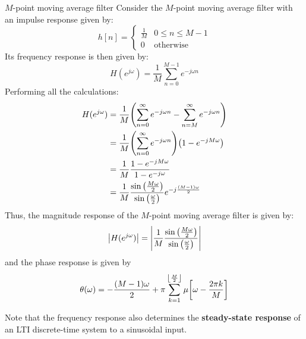 \documentclass[../../main/main.tex]{subfiles}
\begin{document}
\begin{example}{\( M \)-point moving average filter}{}
    Consider the \( M \)-point moving average filter with an impulse response given by:
    \begin{equation}
        h[n]
        =
        \begin{cases}
            \frac{1}{M} &   0 \le n \le M-1 \\
            0   &   \text{otherwise}
        \end{cases}
        \label{eq:L09_S40_1}
    \end{equation}
    Its frequency response is then given by:
    \begin{equation}
        H(e^{j\omega})
        =
        \frac{1}{M} \sum_{n=0}^{M-1} e^{-j\omega n}
        \label{eq:L09_S40_2}
    \end{equation}
    Performing all the calculations:
    \begin{align}
        H(e^{j\omega})
        &=
            \frac{1}{M} \qty(\sum_{n=0}^{\infty} e^{-j\omega n}  -  \sum_{n=M}^{\infty} e^{-j\omega n})    \nonumber   \\
        &=
            \frac{1}{M} \qty(\sum_{n=0}^{\infty} e^{-j\omega n}) \qty(1 - e^{-jM\omega}) \nonumber   \\
        &=
            \frac{1}{M} \frac{1 - e^{-jM\omega}}{1 - e^{-j\omega}}  \nonumber   \\
        &=
            \frac{1}{M} \frac{\sin\qty(\frac{M\omega}{2})}{\sin\qty(\frac{\omega}{2})} e^{-j \frac{(M-1)\omega}{2}}
    \end{align}
    Thus, the magnitude response of the \( M \)-point moving average filter is given by:
    \begin{equation}
        \abs{H(e^{j\omega})}
        =
        \abs{\frac{1}{M} \frac{\sin\qty(\frac{M\omega}{2})}{\sin\qty(\frac{\omega}{2})}}
        \label{eq:L09_S42_1}
    \end{equation}
    and the phase response is given by
    \begin{equation}
        \theta(\omega)
        =
        - \frac{(M-1)\omega}{2} + \pi  \sum_{k=1}^{\left \lfloor \frac{M}{2} \right \rfloor} \mu\qty[\omega - \frac{2\pi k}{M}]
        \label{eq:L09_S42_2}
    \end{equation}
\end{example}

Note that the frequency response also determines the \textbf{steady-state response} of an LTI discrete-time system to a sinusoidal input.
\end{document}
